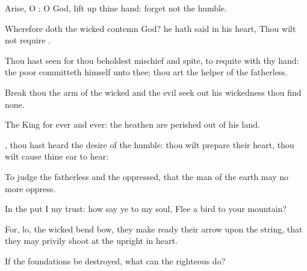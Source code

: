 {\Q {}Arise, O
{}; O
God, lift
up thine
hand:
forget not the
humble.


\par }{\Q {}Wherefore doth the
wicked
contemn
God? he hath
said in his
heart, Thou wilt not
require
{}.


\par }{\Q {}Thou hast
seen
{} for thou
beholdest
mischief and
spite, to
requite
{} with thy
hand: the
poor
committeth himself unto thee; thou art the
helper of the
fatherless.


\par }{\Q {}Break thou the
arm of the
wicked and the
evil
{} seek
out his
wickedness
{} thou
find
none.


\par }{\Q {}The
{}
{}
King for
ever and
ever: the
heathen are
perished out of his
land.


\par }{\Q {}, thou hast
heard the
desire of the
humble: thou wilt
prepare their
heart, thou wilt cause thine
ear to
hear:


\par }{\Q {}To
judge the
fatherless and the
oppressed, that the
man of the
earth may no
more
oppress.




\par }
{\Q {}In the
{} put I my
trust: how
say ye to my
soul,
Flee
{} a
bird to your
mountain?


\par }{\Q {}For, lo, the
wicked
bend
{}
bow, they make
ready their
arrow upon the
string, that they may
privily
shoot at the
upright in
heart.


\par }{\Q {}If the
foundations be
destroyed, what can the
righteous
do?


\par }{\BB \par }
